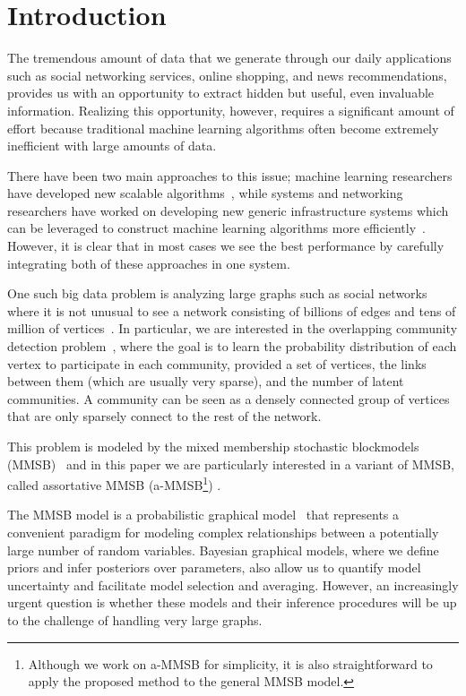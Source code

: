\section{Introduction}
The tremendous amount of data that we generate through our daily applications such as social networking services, online shopping, and news recommendations, provides us with an opportunity to extract hidden but useful, even invaluable information. Realizing this opportunity, however, requires a significant amount of effort because traditional machine learning algorithms often become extremely inefficient with large amounts of data.

There have been two main approaches to this issue; machine learning researchers have developed new scalable algorithms~\cite{bottou2010large, boyd2011distributed}, while systems and networking researchers have worked on developing new generic infrastructure systems which can be leveraged to construct machine learning algorithms more efficiently~\cite{dean2008mapreduce, chang2008bigtable}. However, it is clear that in most cases we see the best performance by carefully integrating both of these approaches in one system.

One such big data problem is analyzing large graphs such as social networks where it is not unusual to see a network consisting of billions of edges and tens of million of vertices~\cite{yang2015defining}. In particular, we are interested in the overlapping community detection problem~\cite{xie2013overlapping}, where the goal is to learn the probability distribution of each vertex to participate in each community, provided a set of vertices, the links between them (which are usually very sparse), and the number of latent communities. A community can be seen as a densely connected group of vertices that are only sparsely connect to the rest of the network. 

This problem is modeled by the mixed membership stochastic blockmodels (MMSB)~\cite{airoldi2009mixed} and in this paper we are particularly interested in a variant of MMSB, called assortative MMSB (a-MMSB\footnote{Although we work on a-MMSB for simplicity, it is also straightforward to apply the proposed method to the general MMSB model.}) \cite{gopalan2012scalable}.

The MMSB model is a probabilistic graphical model~\cite{koller2009probabilistic} that represents a convenient paradigm for modeling complex relationships between a potentially large number of random variables. Bayesian graphical models, where we define priors and infer posteriors over parameters, also allow us to quantify model uncertainty and facilitate model selection and averaging. However, an increasingly urgent question is whether these models and their inference procedures will be up to the challenge of handling very large graphs.

